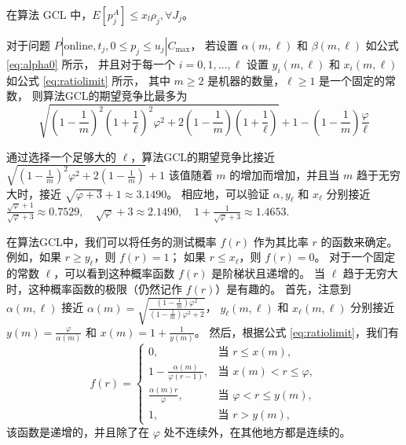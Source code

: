 \begin{lem}
在算法 GCL 中，$E[p_j^A]\leq x_l\rho_j, \forall J_j$。
\end{lem}

\begin{thm}
    对于问题 \( P | \text{online}, t_j, 0 \leq p_j \leq u_j | C_{\max} \)，
    若设置 \( \alpha(m, \ell) \) 和 \( \beta(m, \ell) \) 如公式 \ref{eq:alpha0} 所示，
    并且对于每一个 \( i = 0, 1, \ldots, \ell \) 
    设置 \( y_i(m, \ell) \) 和 \( x_i(m, \ell) \) 如公式 \ref{eq:ratiolimit} 所示，
    其中 \( m \geq 2 \) 是机器的数量，\( \ell \geq 1 \) 是一个固定的常数，
    则算法GCL的期望竞争比最多为
    \[
        \sqrt{(1 - \frac{1}{m})^2 (1 + \frac{1}{\ell})^2 \varphi^2 + 2(1 - \frac{1}{m})(1 + \frac{1}{\ell})} + 1 - (1 - \frac{1}{m}) \frac{\varphi}{\ell}
    \]
\end{thm}

通过选择一个足够大的 \( \ell \)，算法GCL的期望竞争比接近
\( \sqrt{(1 - \frac{1}{m})^2 \varphi^2 + 2(1 - \frac{1}{m})} + 1 \)
该值随着 \( m \) 的增加而增加，并且当 \( m \) 趋于无穷大时，接近 \( \sqrt{\varphi + 3} + 1 \approx 3.1490 \)。
相应地，可以验证 \( \alpha, y_\ell \) 和 \( x_\ell \) 分别接近
\( \frac{\sqrt{\varphi} + 1}{\sqrt{\varphi} + 3} \approx 0.7529, \quad \sqrt{\varphi} + 3 \approx 2.1490, \quad 1 + \frac{1}{\sqrt{\varphi} + 3} \approx 1.4653. \)

在算法GCL中，我们可以将任务的测试概率 \( f(r) \) 作为其比率 \( r \) 的函数来确定。
例如，如果 \( r \geq y_\ell \)，则 \( f(r) = 1 \)；
如果 \( r \leq x_\ell \)，则 \( f(r) = 0 \)。
对于一个固定的常数 \( \ell \)，可以看到这种概率函数 \( f(r) \) 是阶梯状且递增的。
当 \( \ell \) 趋于无穷大时，这种概率函数的极限（仍然记作 \( f(r) \)）是有趣的。
首先，注意到 \( \alpha(m, \ell) \) 接近 \( \alpha(m) = \sqrt{\frac{(1 - \frac{1}{m}) \varphi^2}{(1 - \frac{1}{m}) \varphi^2 + 2}} \)，
\( y_\ell(m, \ell) \) 和 \( x_\ell(m, \ell) \) 分别接近 \( y(m) = \frac{\varphi}{\alpha(m)} \) 和 \( x(m) = 1 + \frac{1}{y(m)} \)。
然后，根据公式 \ref{eq:ratiolimit}，我们有
\[
f(r) =
\begin{cases}
0, & \text{当 } r \leq x(m), \\
1 - \frac{\alpha(m)}{\varphi (r-1)}, & \text{当 } x(m) < r \leq \varphi, \\
\frac{\alpha(m) r}{\varphi}, & \text{当 } \varphi < r \leq y(m), \\
1, & \text{当 } r > y(m),
\end{cases}
\]
该函数是递增的，并且除了在 \( \varphi \) 处不连续外，在其他地方都是连续的。

